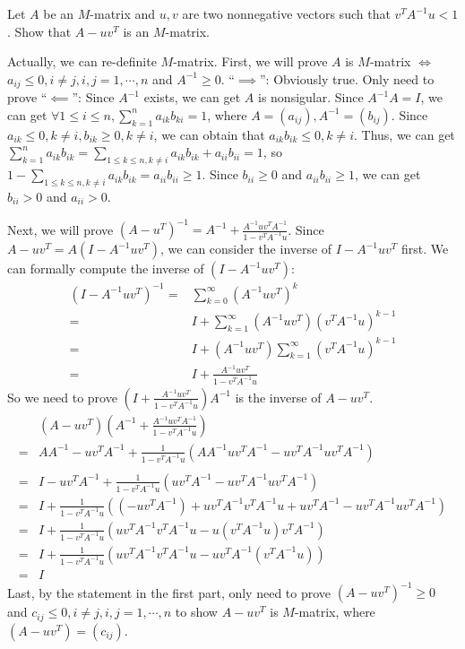 \documentclass{ctexart}
\begin{document}
\begin{problem}  
  Let \(A \) be an \(M \)-matrix and \(u,v \) are two nonnegative vectors such 
  that \(v^T A^{-1} u <1 \). Show that \(A-uv^T \) is an \(M \)-matrix.
\end{problem}
\begin{solution}
 Actually, we can  re-definite \(M\)-matrix. First, we will prove \(A \) is \(M \)-matrix \(\iff \) \(a_{ij} \leq 0, i \neq j, i,j =1,\cdots,n \) 
  and \(A^{-1} \geq 0 \).
  ``\(\implies\)'': Obviously true. Only need to prove ``\(\impliedby\)'': Since \(A^{-1} \) exists, we can get \(A \) is nonsigular. 
  Since \(A^{-1}A=I \), we can get \(\forall 1 \leq i \leq n, \sum_{k=1}^{n}a_{ik}b_{ki}=1\), where \(A=(a_{ij}), A^{-1}=(b_{ij}) \). Since \(a_{ik} \leq 0, k \neq i , b_{ik} \geq 0,k \neq i \), 
  we can obtain that \(a_{ik}b_{ik} \leq 0, k \neq i \).
  Thus, we can get \(\sum_{k=1}^{n}a_{ik}b_{ik}=\sum_{1 \leq k \leq n, k \neq i}a_{ik}b_{ik} + a_{ii}b_{ii} =1 \), so \(1-\sum_{1 \leq k \leq n, k \neq i}a_{ik}b_{ik}=a_{ii}b_{ii}\geq 1 \). 
  Since \(b_{ii} \geq 0 \) and \(a_{ii}b_{ii} \geq 1 \), we can get \(b_{ii}>0 \) and \(a_{ii}>0 \). 

  Next, we will prove \((A-u^T)^{-1}=A^{-1} + \frac{A^{-1}uv^TA^{-1}}{1-v^TA^{-1}u} \). Since \(A-uv^T=A(I-A^{-1}uv^T) \), we can consider the inverse of \(I-A^{-1}uv^T \) first. 
  We can formally compute the inverse of \((I-A^{-1}uv^T) \):
  \[
    \begin{aligned}
      (I-A^{-1}uv^T)^{-1}=&\sum_{k=0}^{\infty}(A^{-1}uv^T)^k\\ 
      =& I + \sum_{k=1}^{\infty}(A^{-1}uv^T)(v^TA^{-1}u)^{k-1}\\ 
      =&I + (A^{-1}uv^T)\sum_{k=1}^{\infty}(v^TA^{-1}u)^{k-1}\\ 
      =&I +\frac{A^{-1}uv^T}{1-v^TA^{-1}u}
    \end{aligned}
  \]
  So we need to prove \((I + \frac{A^{-1}uv^T}{1-v^TA^{-1}u})A^{-1} \) is the inverse of \(A-uv^T \). 
  \[
    \begin{aligned}
      &(A-uv^T)(A^{-1} + \frac{A^{-1}uv^TA^{-1}}{1-v^TA^{-1}u})\\
  =&AA^{-1} - uv^TA^{-1} + \frac{1}{1-v^TA^{-1}u}(AA^{-1}uv^TA^{-1}-uv^TA^{-1}uv^TA^{-1})\\ \\
      =&I -uv^TA^{-1} + \frac{1}{1-v^TA^{-1}u}(uv^TA^{-1}-uv^TA^{-1}uv^TA^{-1})\\ 
      =&I + \frac{1}{1-v^TA^{-1}u}((-uv^TA^{-1}) + uv^TA^{-1}v^TA^{-1}u + uv^TA^{-1} -uv^TA^{-1}uv^TA^{-1})\\ 
      =&I + \frac{1}{1-v^TA^{-1}u}(uv^TA^{-1}v^TA^{-1}u - u(v^TA^{-1}u)v^TA^{-1})\\ 
      =&I + \frac{1}{1-v^TA^{-1}u}(uv^TA^{-1}v^TA^{-1}u-uv^TA^{-1}(v^TA^{-1}u))\\ 
      =&I
    \end{aligned}
  \]
  Last, by the statement in the first part, only need to prove \((A-uv^T)^{-1} \geq 0 \) and \( c_{ij} \leq 0, i \neq j, i,j =1,\cdots,n\)
  to show \(A-uv^T \) is \(M \)-matrix, where \((A-uv^T)=(c_{ij}) \).
 

\end{solution}
\end{document}
